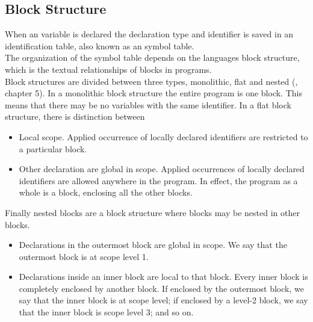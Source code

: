 \subsection*{Block Structure }
When an variable is declared the declaration type and identifier is saved in an identification table, also known as an symbol table. \\
The organization of the symbol table depends on the languages block structure, which is the textual relationships of blocks in programs. \\
Block structures are divided between three types, monolithic, flat and nested (\cite{compilers-and-intepreters}, chapter 5).
In a monolithic block structure the entire program is one block. This means that there may be no variables with the same identifier.
In a flat block structure, there is distinction between
\begin{itemize}
    \item Local scope. Applied occurrence of locally declared identifiers are restricted to a particular block.
    \item Other declaration are global in scope. Applied occurrences of locally declared identifiers are allowed anywhere in the program. 
    In effect, the program as a whole is a block, enclosing all the other blocks.
\end{itemize}
Finally nested blocks are a block structure where blocks may be nested in other blocks. 
\begin{itemize}
    \item Declarations in the outermost block are global in scope. We say that the outermost block 
is at scope level 1.

\item Declarations inside an inner block are local to that block. Every inner block is completely enclosed by another block. If enclosed by the outermost block, we say that the inner block is at scope level; if enclosed by a level-2 block, we say that the inner block is scope level 3; and so on.
\end{itemize}

